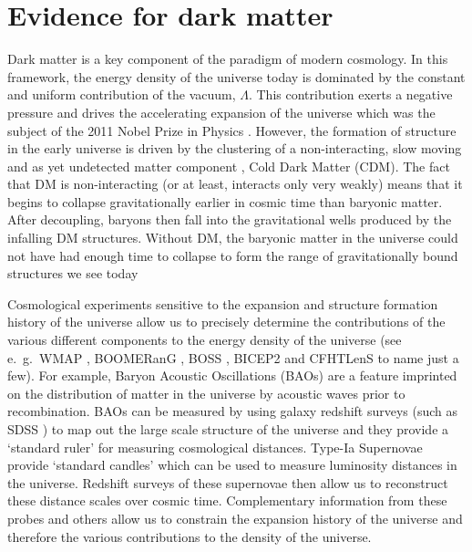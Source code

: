 \section{Evidence for dark matter}


Dark matter is a key component of the \LCDM paradigm of modern cosmology. In this framework, the energy density of the universe today is dominated by the constant and uniform contribution of the vacuum, $\Lambda$. This contribution exerts a negative pressure and drives the accelerating expansion of the universe which was the subject of the 2011 Nobel Prize in Physics \cite{Riess:1998, Perlmutter:1999}. However, the formation of structure in the early universe is driven by the clustering of a non-interacting, slow moving and as yet undetected matter component \cite{Kolb:1990}, Cold Dark Matter (CDM). The fact that DM is non-interacting (or at least, interacts only very weakly) means that it begins to collapse gravitationally earlier in cosmic time than baryonic matter. After decoupling, baryons then fall into the gravitational wells produced by the infalling DM structures. Without DM, the baryonic matter in the universe could not have had enough time to collapse to form the range of gravitationally bound structures we see today \cite{Blumental:1984,Kolb:1990}

Cosmological experiments sensitive to the expansion and structure formation history of the universe allow us to precisely determine the contributions of the various different components to the energy density of the universe (see e.\ g.\  WMAP \cite{Hinshaw:2013}, BOOMERanG \cite{MacTavish:2005}, BOSS \cite{Dawson:2013}, BICEP2 \cite{Ade:2014} and CFHTLenS \cite{Kitching:2014, Fu:2014} to name just a few). For example, Baryon Acoustic Oscillations (BAOs) are a feature imprinted on the distribution of matter in the universe by acoustic waves prior to recombination. BAOs can be measured by using galaxy redshift surveys (such as SDSS \cite{York:2000}) to map out the large scale structure of the universe and they provide a `standard ruler' for measuring cosmological distances. Type-Ia Supernovae provide `standard candles' which can be used to measure luminosity distances in the universe. Redshift surveys of these supernovae \cite{Suzuki:2011} then allow us to reconstruct these distance scales over cosmic time. Complementary information from these probes and others allow us to constrain the expansion history of the universe and therefore the various contributions to the density of the universe.

